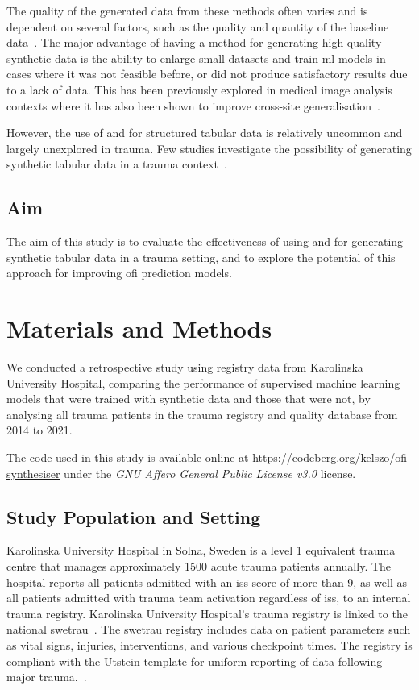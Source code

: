 \documentclass[12pt, a4paper]{article}
\begin{document}
The quality of the generated data from these methods often varies and is dependent on several factors, such as the
quality and quantity of the baseline data~\cite{karras_training_2020}. The major advantage of having a method for
generating high-quality synthetic data is the ability to enlarge small datasets and train \acrshort{ml} models in cases
where it was not feasible before, or did not produce satisfactory results due to a lack of data. This has been
previously explored in medical image analysis contexts where it has also been shown to improve cross-site
generalisation~\cite{sanaat_robust-deep_2022, bashyam_deep_2022}.

However, the use of  and  for structured tabular data is relatively uncommon and
largely unexplored in trauma. Few studies investigate the possibility of generating synthetic tabular data in a trauma
context~\cite{hernandez_synthetic_2022}.

\subsection{Aim}
The aim of this study is to evaluate the effectiveness of using  and  for generating
synthetic tabular data in a trauma setting, and to explore the potential of this approach for improving \acrshort{ofi}
prediction models.

\section{Materials and Methods}
We conducted a retrospective study using registry data from Karolinska University Hospital, comparing the performance
of supervised machine learning models that were trained with synthetic data and those that were not, by analysing all
trauma patients in the trauma registry and quality database from 2014 to 2021.

The code used in this study is available online at \url{https://codeberg.org/kelszo/ofi-synthesiser} under the
\textit{GNU Affero General Public License v3.0} license.

\subsection{Study Population and Setting}
Karolinska University Hospital in Solna, Sweden is a level 1 equivalent trauma centre that manages approximately 1500
acute trauma patients annually. The hospital reports all patients admitted with an \acrfull{iss} score of more than 9,
as well as all patients admitted with trauma team activation regardless of \acrshort{iss}, to an internal trauma
registry. Karolinska University Hospital's trauma registry is linked to the national \acrfull{swetrau}~\cite{swetrau}.
The \acrshort{swetrau} registry includes data on patient parameters such as vital signs, injuries, interventions, and
various checkpoint times. The registry is compliant with the Utstein template for uniform reporting of data following
major trauma.~\cite{ringdal_utstein_2008}.
\end{document}
